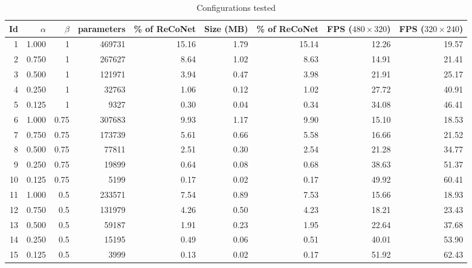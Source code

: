 \documentclass[a4paper,conference]{IEEEtran}
\begin{document}
\begin{table*}[]
\centering
\scriptsize
\caption{Configurations tested}
\label{tab:my-table}
\begin{tabular}{rrrrrrrrr}
\hline
Id & $\alpha$ & $\beta$ & parameters & \% of ReCoNet & Size (MB) & \% of ReCoNet & FPS ($480\times320$) & FPS ($320\times240$)\\ \hline
1  & 1.000 & 1    & 469731     & 15.16         & 1.79     & 15.14         & 12.26       & 19.57       \\
2  & 0.750 & 1    & 267627     & 8.64          & 1.02     & 8.63          & 14.91       & 21.41       \\
3  & 0.500 & 1    & 121971     & 3.94          & 0.47     & 3.98          & 21.91       & 25.17       \\
4  & 0.250 & 1    & 32763      & 1.06          & 0.12     & 1.02          & 27.72       & 40.91       \\
5  & 0.125 & 1    & 9327       & 0.30          & 0.04     & 0.34          & 34.08       & 46.41       \\ \hline
6  & 1.000 & 0.75 & 307683     & 9.93          & 1.17      & 9.90          & 15.10        & 18.53       \\
7  & 0.750 & 0.75 & 173739     & 5.61          & 0.66      & 5.58          & 16.66       & 21.52       \\
8  & 0.500 & 0.75 & 77811      & 2.51          & 0.30       & 2.54          & 21.28       & 34.77       \\
9  & 0.250 & 0.75 & 19899      & 0.64          & 0.08      & 0.68          & 38.63       & 51.37       \\
10 & 0.125 & 0.75 & 5199       & 0.17          & 0.02      & 0.17          & 49.92       & 60.41       \\ \hline
11 & 1.000 & 0.5  & 233571     & 7.54          & 0.89      & 7.53          & 15.66       & 18.93       \\
12 & 0.750 & 0.5  & 131979     & 4.26          & 0.50       & 4.23          & 18.21       & 23.43       \\
13 & 0.500 & 0.5  & 59187      & 1.91          & 0.23      & 1.95          & 22.64       & 37.68       \\
14 & 0.250 & 0.5  & 15195      & 0.49          & 0.06      & 0.51          & 40.01       & 53.90        \\
15 & 0.125 & 0.5  & 3999       & 0.13          & 0.02      & 0.17          & 51.92       & 62.43     \\ \hline

\end{tabular}
\end{table*}
\end{document}
